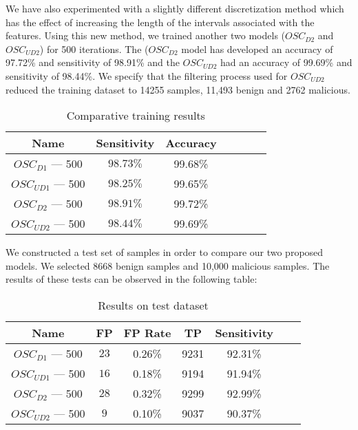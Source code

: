 \par
We have also experimented with a slightly different discretization method which has the effect of increasing the length of the intervals associated with the features. Using this new method, we trained another two models ({$OSC_{D2}$} and {$OSC_{UD2}$}) for 500 iterations. The ({$OSC_{D2}$} model has developed an accuracy of 97.72\% and sensitivity of 98.91\% and
the {$OSC_{UD2}$} had an accuracy of 99.69\% and sensitivity of 98.44\%. We specify that the filtering process used for {$OSC_{UD2}$} reduced the training dataset to 14255 samples, 11,493 benign and 2762 malicious.
\begin{table}[ht]
    \centering
    \begin{tabular}{| c | c | c | c | c | c | c | }
    \hline
    Name & Sensitivity & Accuracy\\ \hline
    \textit{$OSC_{D1}$} --- 500 & $98.73\%$ &  99.68\% \\ \hline
    \textit{$OSC_{UD1}$} --- 500 & $98.25\%$ &  99.65\% \\ \hline
    \textit{$OSC_{D2}$} --- 500  & $98.91\%$ &  99.72\% \\ \hline
    \textit{$OSC_{UD2}$} --- 500 & $98.44\%$ &  99.69\% \\ \hline
    \end{tabular}
    \caption{Comparative training results} 
    \label{tab:trainingresults}
\end{table}
\par
We constructed a test set of samples in order to compare our two proposed models. We selected 8668 benign samples and 10,000 malicious samples. The results of these tests can be observed in the following table:
\begin{table}[ht]
    \centering
    \begin{tabular}{| c | c | c | c | c | c | c | }
    \hline
    Name & FP & FP Rate & TP & Sensitivity\\ \hline
    \textit{$OSC_{D1}$} --- 500 & $23$ & 0.26\% & 9231 & 92.31\% \\ \hline
    \textit{$OSC_{UD1}$} --- 500 & $16$ &  0.18\% & 9194 & 91.94\% \\ \hline
    \textit{$OSC_{D2}$} --- 500 & $28$ & 0.32\% & 9299 & 92.99\% \\ \hline
    \textit{$OSC_{UD2}$} --- 500 & $9$ &  0.10\% & 9037 & 90.37\% \\ \hline
    \end{tabular}
    \caption{Results on test dataset} 
    \label{tab:testresults}
\end{table}
